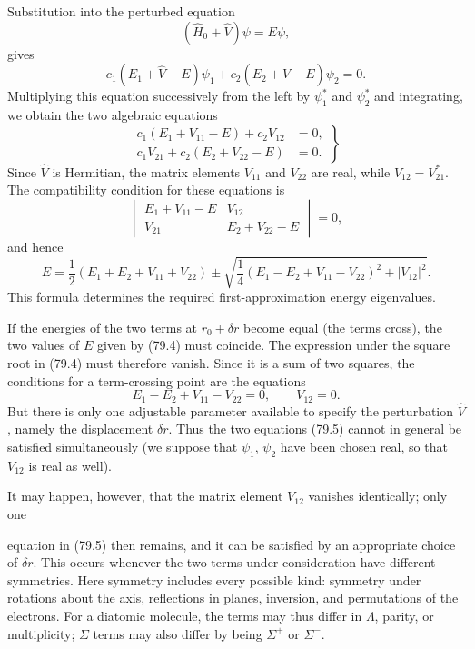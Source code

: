 Substitution into the perturbed equation
\begin{equation}
 (\widehat H_0+\widehat V)\psi=E\psi,
 \tag{79.2}
\end{equation}
gives
\[
 c_1(E_1+\widehat V-E)\psi_1+c_2(E_2+\widehat V-E)\psi_2=0.
\]
Multiplying this equation successively from the left by $\psi_1^*$ and $\psi_2^*$ and integrating, we obtain the two algebraic equations
\begin{equation}
 \left.\begin{aligned}
 c_1(E_1+V_{11}-E)+c_2V_{12}&=0,\\
 c_1V_{21}+c_2(E_2+V_{22}-E)&=0.
 \end{aligned}\right\}
 \tag{79.3}
\end{equation}
Since $\widehat V$ is Hermitian, the matrix elements $V_{11}$ and $V_{22}$ are real, while $V_{12}=V_{21}^*$. The compatibility condition for these equations is
\[
 \begin{vmatrix}E_1+V_{11}-E&V_{12}\\V_{21}&E_2+V_{22}-E\end{vmatrix}=0,
\]
and hence
\begin{equation}
 E=\frac12(E_1+E_2+V_{11}+V_{22})\pm
 \sqrt{\frac14(E_1-E_2+V_{11}-V_{22})^2+|V_{12}|^2}.
 \tag{79.4}
\end{equation}
This formula determines the required first-approximation energy eigenvalues.

If the energies of the two terms at $r_0+\delta r$ become equal (the terms cross), the two values of $E$ given by (79.4) must coincide. The expression under the square root in (79.4) must therefore vanish. Since it is a sum of two squares, the conditions for a term-crossing point are the equations
\begin{equation}
 E_1-E_2+V_{11}-V_{22}=0,\qquad V_{12}=0.
 \tag{79.5}
\end{equation}
But there is only one adjustable parameter available to specify the perturbation $\widehat V$, namely the displacement $\delta r$. Thus the two equations (79.5) cannot in general be satisfied simultaneously (we suppose that $\psi_1$, $\psi_2$ have been chosen real, so that $V_{12}$ is real as well).

It may happen, however, that the matrix element $V_{12}$ vanishes identically; only one

equation in (79.5) then remains, and it can be satisfied by an appropriate choice of $\delta r$. This occurs whenever the two terms under consideration have different symmetries. Here symmetry includes every possible kind: symmetry under rotations about the axis, reflections in planes, inversion, and permutations of the electrons. For a diatomic molecule, the terms may thus differ in $\Lambda$, parity, or multiplicity; $\Sigma$ terms may also differ by being $\Sigma^+$ or $\Sigma^-$.

